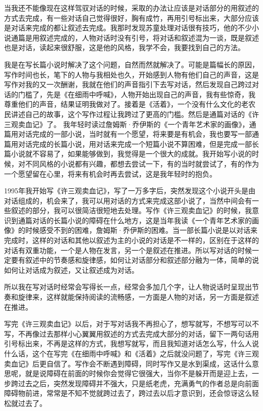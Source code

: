 \documentclass[12pt,a5paper]{ctexbook}
\begin{document}
当我还不能像现在这样驾驭对话的时候，采取的办法让应该是对话部分的用叙述的方式去完成，有一些对话自己觉得很好，胸有成竹，再用引号标出来，大部分应该是对话来完成的都让叙述去完成。我那时发现苏童处理对话很有技巧，他的不少小说通篇是用叙述完成的，人物对话时没有引号，将对话和叙述混为一谈，既是叙述也是对话，读起来很舒服，这是他的风格，我学不会，我要找到自己的方法。

我是在写长篇小说时解决了这个问题，自然而然就解决了。可能是篇幅长的原因，写作时间也长，笔下的人物与我相处也久，开始感到人物有他们自己的声音，这是写作对我的又一次酬谢，我就在他们的声音指引下去写对话，然后发现自己跨过对话的门槛了，先是《在细雨中呼喊》，人物开始出现自己的声音，我有些惊奇，我尊重他们的声音，结果证明我做对了。接着是《活着》，一个没有什么文化的老农民讲述自己的故事，这个写作过程让我跨过了更高的门槛。然后是通篇对话的《许三观卖血记》了。
我年轻时读过詹姆斯·乔伊斯的《一个青年艺术家的画像》，通篇用对话完成的一部小说，当时就有一个愿望，将来要是有机会，我也要写一部通篇用对话完成的长篇小说，用对话来完成一个短篇小说不算困难，但是完成一部长篇小说就不容易了，如果能够做到，我觉得是一个很大的成就。我开始写小说的时候，对不同风格的小说都有兴趣，都想去尝试一下，有的当时就尝试了，有的作为一个愿望留在心里，将来有机会时再去尝试，这是我年轻时的抱负。

1995年我开始写《许三观卖血记》，写了一万多字后，突然发现这个小说开头是由对话组成的，机会来了，我可以用对话的方式来完成这部小说了，当然中间会有一些叙述的部分，我可以很简洁很短地去处理。写作《许三观卖血记》的时候，我意识到通篇对话的长篇小说的障碍在什么地方，这是当年我读《一个青年艺术家的画像》的时候感受不到的困难，詹姆斯·乔伊斯的困难。当一部长篇小说是以对话来完成时，这样的对话和其他以叙述为主的小说的对话是不一样的，区别在于这样的对话有双重功能，一个是人物在发言，另一个是叙述在推进。所以写对话的时候一定要有叙述中的节奏感和旋律感，如何让对话部分和叙述部分融为一体，简单的说如何让对话成为叙述，又让叙述成为对话。

所以我在写对话时经常会写得长一点，经常会多加几个字，让人物说话时呈现出节奏和旋律来，这样就能保持阅读的流畅感，一方面是人物的对话，另一方面是叙述在推进。

写完《许三观卖血记》以后，对于写对话我不再担心了，想写就写，不想写可以不写，不再像过去那样小心翼翼用叙述的方式去完成大部分的对话，留下一两句话用引号标出来，不再是这样的方式，我想写就写，而且我知道对话怎么写，什么人说什么话，这个在写完《在细雨中呼喊》和《活着》之后就没问题了，写完《许三观卖血记》后更自信了。写作会不断遇到障碍，同时写作又是水到渠成，这话什么意思呢，就是说障碍在前面的时候你会觉得它很强大，当你不是躲开而是迎上去，一步跨过去之后，突然发现障碍并不强大，只是纸老虎，充满勇气的作者总是向前面障碍物前进，常常是不知不觉就跨过去了，跨过去以后才意识到，还会惊讶这么轻松就过去了。
\end{document}
